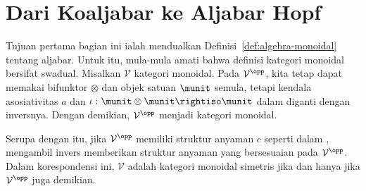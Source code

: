 
\section{Dari Koaljabar ke Aljabar Hopf}\label{sec:bialgebra}
\hypertarget{o014.aljabr2.chapter7.coalgebra-to-hopf-a}{ }
Tujuan pertama bagian ini ialah mendualkan Definisi~\ref{def:algebra-monoidal}
tentang aljabar. Untuk itu, mula-mula amati bahwa definisi kategori monoidal
bersifat swadual. Misalkan $\mathcal{V}$ kategori monoidal. Pada
$\mathcal{V}^{\opp}$, kita tetap dapat memakai bifunktor $\otimes$ dan objek
satuan $\munit$ semula, tetapi kendala asosiativitas $a$ dan
$\iota:\munit\otimes\munit\rightiso\munit$ dalam
\cite[Definisi 3.1.1]{Li1} diganti dengan inversnya. Dengan demikian,
$\mathcal{V}^{\opp}$ menjadi kategori monoidal.

Serupa dengan itu, jika $\mathcal{V}^{\opp}$ memiliki struktur anyaman $c$
seperti dalam \cite[Definisi 3.3.1]{Li1}, mengambil invers memberikan
struktur anyaman yang bersesuaian pada $\mathcal{V}^{\opp}$. Dalam
korespondensi ini, $\mathcal{V}$ adalah kategori monoidal simetris jika dan
hanya jika $\mathcal{V}^{\opp}$ juga demikian.

